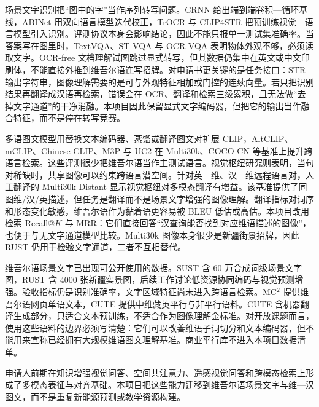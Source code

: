 场景文字识别把“图中的字”当作序列转写问题。CRNN 给出端到端卷积—循环基线，ABINet 用双向语言模型迭代校正，TrOCR 与 CLIP4STR 把预训练视觉—语言模型引入识别\cite{shi2017end,fang2021read,li2023trocr,zhao2024clip4str}。评测协议本身会影响结论，因此不能只报单一测试集准确率\cite{baek2019what}。当答案写在图里时，TextVQA、ST-VQA 与 OCR-VQA 表明物体外观不够，必须读取文字\cite{singh2019towards,biten2019scene,mishra2019ocr,hu2020iterative}。OCR-free 文档理解试图跳过显式转写\cite{kim2022ocr}，但其数据仍集中在英文或中文印刷体，不能直接外推到维吾尔语连写招牌。对申请书更关键的是任务接口：STR 输出字符串，图像理解需要的是可与外观特征相加或门控的连续向量。若只把识别结果再翻译成汉语再检索，错误会在 OCR、翻译和检索三级累积，且无法做“去掉文字通道”的干净消融。本项目因此保留显式文字编码器，但把它的输出当作融合特征，而不是停在转写竞赛。

多语图文模型用替换文本编码器、蒸馏或翻译图文对扩展 CLIP，AltCLIP、mCLIP、Chinese CLIP、M3P 与 UC2 在 Multi30k、COCO-CN 等基准上提升跨语言检索\cite{chen2023altclip,chen2023mclip,yang2022chineseclip,ni2021m3p,zhou2021uc2,elliott2016multi30k}。这些评测很少把维吾尔语当作主测试语言。视觉枢纽研究则表明，当句对稀缺时，共享图像可以约束跨语言潜空间\cite{huang2020unsupervised}。针对英—维、汉—维远程语言对，人工翻译的 Multi30k-Distant 显示视觉枢纽对多模态翻译有增益\cite{tayir2024visual,tayir2024unsupervised}。该基准提供了同图维/汉/英描述，但任务是翻译而不是场景文字增强的图像理解。翻译指标对词序和形态变化敏感，维吾尔语作为黏着语更容易被 BLEU 低估或高估。本项目改用检索 Recall@$K$ 与 MRR：它们直接回答“汉查询能否找到对应维语描述的图像”，也便于与无文字通道模型比较。Multi30k 图像本身很少是新疆街景招牌，因此 RUST 仍用于检验文字通道，二者不互相替代。

维吾尔语场景文字已出现可公开使用的数据。SUST 含 60 万合成词级场景文字图，RUST 含 4000 张新疆实景图，后续工作讨论低资源协同编码与视觉预测增强\cite{kong2023sust,yang2024collaborative,ma2023scene}。验收指标仍是识别准确率，文字区域特征尚未进入跨语言检索。MC$^2$ 提供维吾尔语网页单语文本，CUTE 提供中维藏英平行与非平行语料\cite{zhang2024mc2,zhuang2025cute}。CUTE 含机器翻译生成部分，只适合文本预训练，不适合作为图像理解金标准。对开放课题而言，使用这些语料的边界必须写清楚：它们可以改善维语子词切分和文本编码器，但不能用来宣称已经拥有大规模维语图文理解基准。商业平行库不进入本项目数据清单。

申请人前期在知识增强视觉问答、空间共注意力、遥感视觉问答和跨模态检索上形成了多模态表征与对齐基础\cite{yan2024knowledge,yan2022spca,xu2026rshr,xu2026rssr}。本项目把这些能力迁移到维吾尔语场景文字与维—汉图文，而不是重复新能源预测或教学资源构建。

